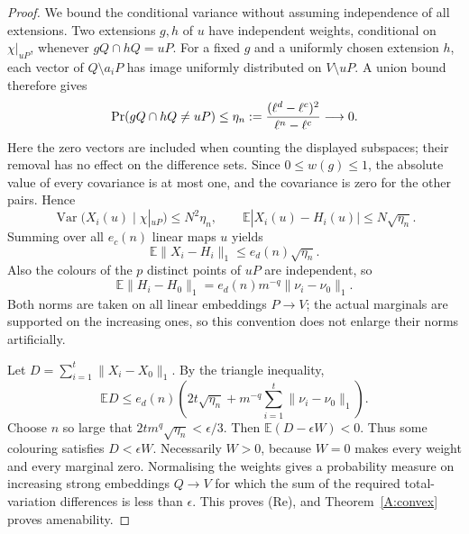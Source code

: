 \begin{proof}
We bound the conditional variance without assuming independence of
all extensions. Two extensions $g,h$ of $u$ have independent weights,
conditional on $\chi|_{uP}$, whenever $gQ\cap hQ=uP$. For a fixed $g$
and a uniformly chosen extension $h$, each vector of $Q\setminus a_iP$
has image uniformly distributed on $V\setminus uP$. A union bound
therefore gives
\[
 \Pr(gQ\cap hQ\ne uP)
 \leq \eta_n:={ (\ell^d-\ell^c)^2\over\ell^n-\ell^c}
 \longrightarrow0.
\]
Here the zero vectors are included when counting the displayed
subspaces; their removal has no effect on the difference sets.
Since $0\leq w(g)\leq1$, the absolute value of every covariance is
at most one, and the covariance is zero for the other pairs. Hence
\[
 \operatorname{Var}(X_i(u)\mid\chi|_{uP})\leq N^2\eta_n,
 \qquad
 \mathbb E|X_i(u)-H_i(u)|\leq N\sqrt{\eta_n}.
\]
Summing over all $e_c(n)$ linear maps $u$ yields
\[
 \mathbb E\|X_i-H_i\|_1\leq e_d(n)\sqrt{\eta_n}.
\]
Also the colours of the $p$ distinct points of $uP$ are independent,
so
\[
 \mathbb E\|H_i-H_0\|_1
   =e_d(n)m^{-q}\|\nu_i-\nu_0\|_1.
\]
Both norms are taken on all linear embeddings $P\to V$; the actual
marginals are supported on the increasing ones, so this convention
does not enlarge their norms artificially.

Let $D=\sum_{i=1}^t\|X_i-X_0\|_1$. By the triangle inequality,
\[
 \mathbb E D\leq e_d(n)
 \left(2t\sqrt{\eta_n}
       +m^{-q}\sum_{i=1}^t\|\nu_i-\nu_0\|_1\right).
\]
Choose $n$ so large that $2t m^q\sqrt{\eta_n}<\epsilon/3$.
Then $\mathbb E(D-\epsilon W)<0$. Thus some colouring satisfies
$D<\epsilon W$. Necessarily $W>0$, because $W=0$ makes every weight
and every marginal zero. Normalising the weights gives a probability
measure on increasing strong embeddings $Q\to V$ for which the sum
of the required total-variation differences is less than $\epsilon$.
This proves (Re), and Theorem~\ref{A:convex} proves amenability.
\end{proof}



